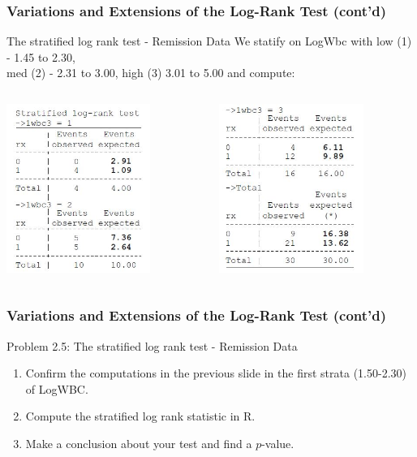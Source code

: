\documentclass{beamer}
\theoremstyle{definition}
\begin{document}
\begin{frame}
\frametitle{Variations and Extensions of the Log-Rank Test (cont'd)}
\begin{block}{The stratified log rank test - Remission Data}
We statify on LogWbc with low (1) - 1.45 to 2.30, \\ med (2) - 2.31 to 3.00, high (3) 3.01 to 5.00 and compute:
\begin{columns}
    \begin{column}{0.48\textwidth}
        \includegraphics[width =\textwidth, height=5.5cm]{strat_lr1.JPG}
    \end{column}
    \hspace{-10pt}
    \begin{column}{0.48\textwidth}
         \includegraphics[width =\textwidth, height=5.5cm]{strat_lr2.JPG}
    \end{column}
\end{columns}
\end{block}
\end{frame}

\begin{frame}
\frametitle{Variations and Extensions of the Log-Rank Test (cont'd)}
\begin{block}{Problem 2.5: The stratified log rank test - Remission Data}
\begin{enumerate}
\item Confirm the computations in the previous slide in the first strata (1.50-2.30) of LogWBC. 
\item Compute the stratified log rank statistic in R. 
\item Make a conclusion about your test and find a $p$-value. 
\end{enumerate} 
\end{block} 
\end{frame}
\end{document}
